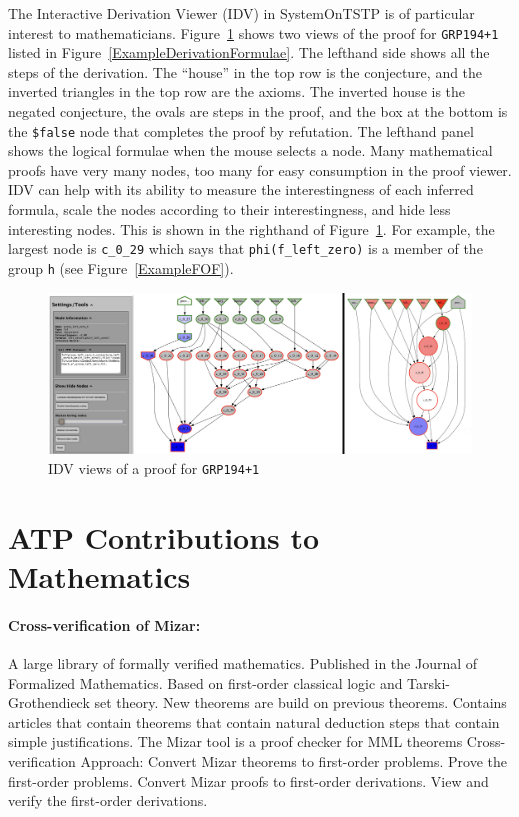 \documentclass[runningheads]{llncs}
\begin{document}
The Interactive Derivation Viewer (IDV) in SystemOnTSTP is of particular interest to mathematicians.
Figure~\ref{IDV} shows two views of the proof for {\tt GRP194+1} listed in 
Figure~\ref{ExampleDerivationFormulae}.
The lefthand side shows all the steps of the derivation.
The ``house'' in the top row is the conjecture, and the inverted triangles in the top row are the
axioms.
The inverted house is the negated conjecture, the ovals are steps in the proof, and the box at the
bottom is the {\tt \$false} node that completes the proof by refutation.
The lefthand panel shows the logical formulae when the mouse selects a node.
Many mathematical proofs have very many nodes, too many for easy consumption in the proof viewer.
IDV can help with its ability to measure the interestingness of each inferred formula, scale the
nodes according to their interestingness, and hide less interesting nodes.
This is shown in the righthand of Figure~\ref{IDV}.
For example, the largest node is {\tt c\_0\_29} which says that {\tt phi(f\_left\_zero)} is a 
member of the group {\tt h} (see Figure~\ref{ExampleFOF}).

\begin{figure}[htb]
\centering
\includegraphics[width=1.0\textwidth]{IDV.pdf}
\vspace*{-1em}
\caption{IDV views of a proof for {\tt GRP194+1}}
\label{IDV}
\end{figure}

\section{ATP Contributions to Mathematics}
\label{Contributions}

\paragraph{Cross-verification of Mizar:}
A large library of formally verified mathematics.
Published in the Journal of Formalized Mathematics.
Based on first-order classical logic and Tarski-Grothendieck set theory.
New theorems are build on previous theorems.
Contains articles that contain theorems that contain natural deduction steps that 
contain simple justifications.
The Mizar tool is a proof checker for MML theorems
Cross-verification Approach:
Convert Mizar theorems to first-order problems.
Prove the first-order problems.
Convert Mizar proofs to first-order derivations.
View and verify the first-order derivations.
\end{document}
